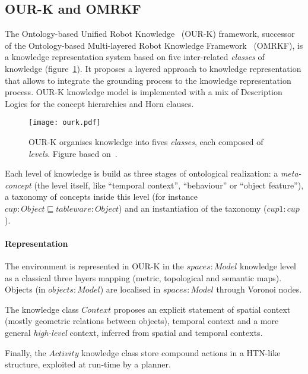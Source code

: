 \documentclass{IEEEtran}
\begin{document}
\subsection{OUR-K and OMRKF}
\label{sect|omrkf}

The Ontology-based Unified Robot Knowledge~\cite{Lim2011} (OUR-K) framework,
successor of the Ontology-based Multi-layered Robot Knowledge
Framework~\cite{Suh2007} (OMRKF), is a knowledge representation system based on
five inter-related \emph{classes} of knowledge (figure~\ref{fig|omrkf}). It
proposes a layered approach to knowledge representation that allows to
integrate the grounding process to the knowledge representation process. OUR-K
knowledge model is implemented with a mix of Description Logics for the concept
hierarchies and Horn clauses.

\begin{figure}
    \centering
    \texttt{[image: ourk.pdf]}

    \caption{OUR-K organises knowledge into fives \emph{classes}, each composed
    of \emph{levels}. Figure based on~\cite{Lim2011}.}

    \label{fig|omrkf}
\end{figure}

Each level of knowledge is build as three stages of ontological realization: a
\emph{meta-concept} (the level itself, like ``temporal context'', ``behaviour''
or ``object feature''), a taxonomy of concepts inside this level (for instance
$cup : Object \sqsubseteq tableware : Object$) and an instantiation of the
taxonomy ($cup1 : cup$).

\paragraph{Representation} The environment is represented in OUR-K in the
$spaces : Model$ knowledge level as a classical three layers mapping (metric,
topological and semantic maps). Objects (in $objects : Model$) are localised in
$spaces : Model$ through Voronoi nodes.

The knowledge class $Context$ proposes an explicit statement of spatial context
(mostly geometric relations between objects), temporal context and a more
general \emph{high-level} context, inferred from spatial and temporal contexts.

Finally, the $Activity$ knowledge class store compound actions in a HTN-like
structure, exploited at run-time by a planner.

\end{document}
